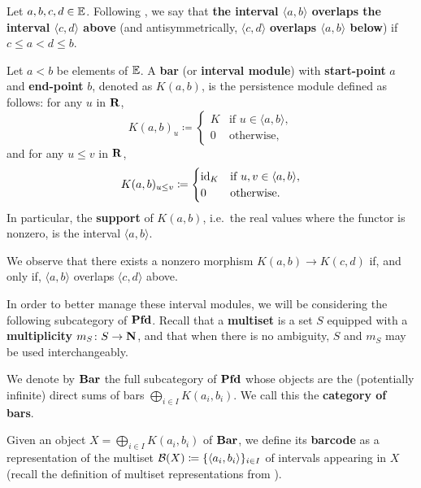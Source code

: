 \begin{definition}
  Let $a, b, c, d \in \E$. Following \cite{BauerLesnick2020}, we say that \textbf{the interval $\langle a, b \rangle$ overlaps the interval $\langle c, d \rangle$ above} (and antisymmetrically, $\langle c, d \rangle$ \textbf{overlaps $\langle a, b \rangle$ below}) if $c \leq a < d \leq b$.
\end{definition}

\begin{definition}
  Let $a < b$ be elements of $\E$.
  A \textbf{bar} (or \textbf{interval module}) with \textbf{start-point} $a$ and \textbf{end-point} $b$, denoted as $K(a, b)$, is the persistence module defined as follows: for any $u$ in $\R$,
  \begin{equation*}
    K(a, b)_u \coloneq
    \begin{cases}
      K & \text{if } u \in \langle a, b \rangle, \\
      0 & \text{otherwise},
    \end{cases}
  \end{equation*}
  and for any $u \leq v$ in $\R$,
  \begin{equation*}
    K(a, b)_{u \leq v} \coloneq
    \begin{cases}
      \id_K & \text{if } u, v \in \langle a, b \rangle, \\
      0 &\text{otherwise}.
    \end{cases}
  \end{equation*}
  In particular, the \textbf{support} of $K(a, b)$, i.e.\ the real values where the functor is nonzero, is the interval $\langle a, b \rangle$.
\end{definition}

\begin{remark}
\label{C!R:overlap}
  We observe that there exists a nonzero morphism $K(a, b) \to K(c, d)$ if, and only if, $\langle a, b \rangle$ overlaps $\langle c, d \rangle$ above.
\end{remark}

In order to better manage these interval modules, we will be considering the following subcategory of $\Pfd$. Recall that a \textbf{multiset} is a set $S$ equipped with a \textbf{multiplicity} $m_S \colon S \to \N$, and that when there is no ambiguity, $S$ and $m_S$ may be used interchangeably.

\begin{definition}
  We denote by $\Bar$ the full subcategory of $\Pfd$ whose objects are the (potentially infinite) direct sums of bars $\bigoplus_{i \in I} K(a_i, b_i)$. We call this the \textbf{category of bars}.

  Given an object $X = \bigoplus_{i \in I} K(a_i, b_i)$ of $\Bar$, we define its \textbf{barcode} as a representation of the multiset $\cc{B}(X) \coloneq \{\langle a_i, b_i \rangle\}_{i \in I}$ of intervals appearing in $X$ (recall the definition of multiset representations from \cite{BauerLesnick2020}).
\end{definition}

